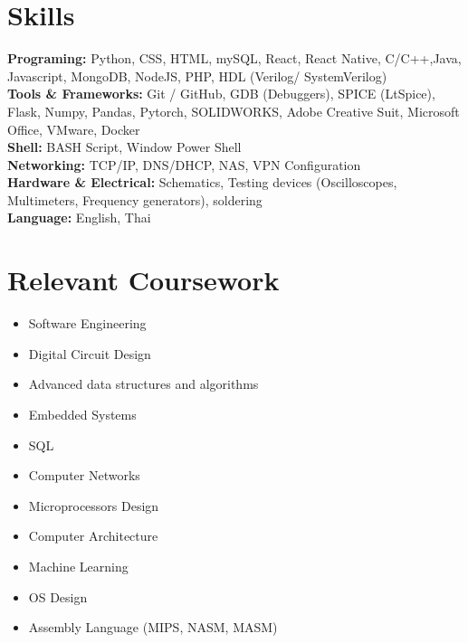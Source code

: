 \documentclass[letterpaper,11pt]{article}
\newcommand{\resumeSubHeadingListStart}{\begin{itemize}[leftmargin=0.0in, label={}]}
\newcommand{\resumeSubHeadingListEnd}{\end{itemize}}
\begin{document}
\section{Skills}
\begin{itemize}[left=0.15in, label={}]
    \small{
    \item \textbf{Programing:} Python, CSS, HTML, mySQL, React, React Native, C/C++,Java, Javascript, MongoDB, NodeJS, PHP, HDL (Verilog/ SystemVerilog) \\
    \textbf{Tools \& Frameworks:} Git / GitHub, GDB (Debuggers), SPICE (LtSpice), Flask, Numpy, Pandas, Pytorch, SOLIDWORKS, Adobe Creative Suit, Microsoft Office, VMware, Docker  \\
    \textbf{Shell:} BASH Script, Window Power Shell \\
    \textbf{Networking:} TCP/IP, DNS/DHCP, NAS, VPN Configuration \\
    \textbf{Hardware \& Electrical:} Schematics, Testing devices (Oscilloscopes, Multimeters, Frequency generators), soldering \\
    \textbf{Language:} English, Thai \\
    }
\end{itemize}
\vspace{-15pt}

\section{Relevant Coursework}
        \begin{multicols}{4}
            \begin{itemize}[itemsep=-1pt, parsep=3pt]
                \item \small Software Engineering
                \item \small Digital Circuit Design 
                \item \small Advanced data structures and algorithms
                \item \small Embedded Systems
                \item \small SQL 
                \item \small Computer Networks
                \item \small Microprocessors Design
                \item \small Computer Architecture
                \item \small Machine Learning
                \item \small OS Design
                \item \small Assembly Language (MIPS, NASM, MASM)
            \end{itemize}
        \end{multicols}
        \vspace*{1.5\multicolsep}
\vspace{8pt}
\end{document}
